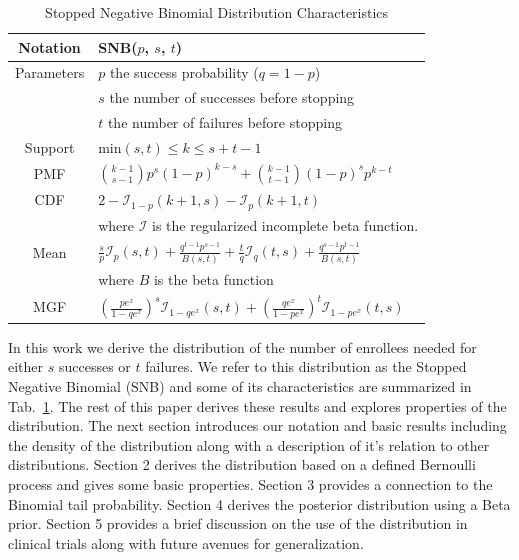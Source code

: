 \documentclass[review]{elsarticle}
\begin{document}
\begin{table}[t!]
\caption{Stopped Negative Binomial Distribution Characteristics}
\label{tab:snb}
\begin{center}
\begin{tabular}{|c|l|} \hline
Notation & SNB($p$, $s$, $t$) \\ \hline
Parameters & $p$ the success probability ($q = 1-p$) \\
           & $s$ the number of successes before stopping \\
           & $t$ the number of failures before stopping \\ \hline
Support & min$(s,t) \leq k \leq s+t-1$  \\ \hline
PMF & ${k-1 \choose s-1} p^s (1-p)^{k-s} + {k-1 \choose t-1} (1-p)^s p^{k-t}$\\ \hline
CDF & $2 - \mathcal{I}_{1-p}(k+1, s) - \mathcal{I}_{p}(k+1, t)$\\ 
    & where $\mathcal{I}$ is the regularized incomplete beta function.\\ \hline
Mean & $\frac{s}{p} \mathcal{I}_p(s,t) + \frac{q^{t-1} p^{s-1}}{B(s,t)} +
  \frac{t}{q} \mathcal{I}_q(t,s) + \frac{q^{s-1}p^{t-1}}{B(s,t)}$\\ 
  & where $B$ is the beta function \\ \hline
MGF & $\left(\frac{p e^x}{1 - qe^x}\right)^s 
  \mathcal{I}_{1-qe^x} (s, t) + \left(\frac{qe^x}{1-pe^x}\right)^t 
  \mathcal{I}_{1-pe^x}(t, s) $\\ \hline
\end{tabular}
\end{center}
\end{table}

In this work we derive the distribution of the number of enrollees needed
for either $s$ successes or $t$ failures. We refer to this distribution
as the Stopped Negative Binomial (SNB) and some of its characteristics are
summarized in Tab.~\ref{tab:snb}.
The rest of this paper derives these results
and explores properties of the distribution.
The next section introduces our notation and basic results
including the density of the distribution along with a description of
it's relation to other distributions. Section 2 derives the distribution
based on a defined Bernoulli process and gives some basic properties.
Section 3 provides a connection to the Binomial tail probability.
Section 4 derives the posterior distribution using a Beta prior.
Section 5 provides a brief discussion on the use of the distribution
in clinical trials along with future avenues for generalization.
\end{document}
